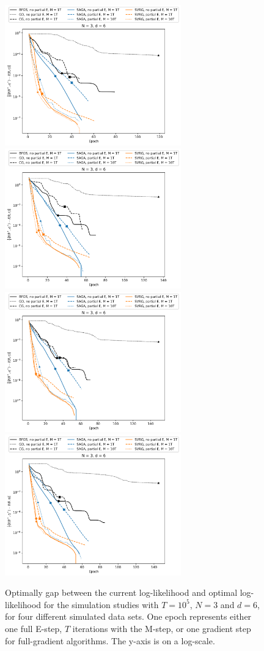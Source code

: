 \documentclass{article}
\begin{document}
%
\begin{figure}
    \centering
    \includegraphics[width=3in]{../plt/log-like_v_epoch_T-100000-K-3-1-d-6-001.png}
    \includegraphics[width=3in]{../plt/log-like_v_epoch_T-100000-K-3-1-d-6-002.png}
    \\
    \includegraphics[width=3in]{../plt/log-like_v_epoch_T-100000-K-3-1-d-6-003.png}
    \includegraphics[width=3in]{../plt/log-like_v_epoch_T-100000-K-3-1-d-6-004.png}   
    \caption{Optimally gap between the current log-likelihood and optimal log-likelihood for the simulation studies with $T=10^{5}$, $N=3$ and $d=6$, for four different simulated data sets. One epoch represents either one full E-step, $T$ iterations with the M-step, or one gradient step for full-gradient algorithms. The y-axis is on a log-scale.}
\end{figure}
\end{document}
